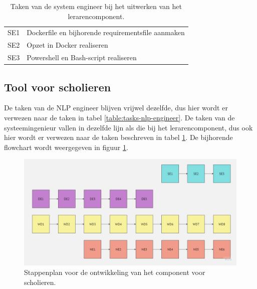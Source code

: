 \begin{center}
	\begin{table}
		\begin{tabular}{|m{2cm}|m{12cm}|}
			\hline
			SE1 & Dockerfile en bijhorende requirementsfile aanmaken \\
			SE2 & Opzet in Docker realiseren \\
			SE3 & Powershell en Bash-script realiseren \\
			\hline
		\end{tabular}
		\label{table:tasks-system-engineer}
		\caption{Taken van de system engineer bij het uitwerken van het lerarencomponent.}
	\end{table}
\end{center}


\subsection{Tool voor scholieren}

De taken van de NLP engineer blijven vrijwel dezelfde, dus hier wordt er verwezen naar de taken in tabel \ref{table:tasks-nlp-engineer}. De taken van de systeemingenieur vallen in dezelfde lijn als die bij het lerarencomponent, dus ook hier wordt er verwezen naar de taken beschreven in tabel \ref{table:tasks-system-engineer}. De bijhorende flowchart wordt weergegeven in figuur \ref{img:stappenplan-scholars}.


\begin{figure}[H]
	\includegraphics[width=\linewidth]{img/flowchart-development-scholars.jpg}
	\caption{Stappenplan voor de ontwikkeling van het component voor scholieren.}
	\label{img:stappenplan-scholars}
\end{figure}


